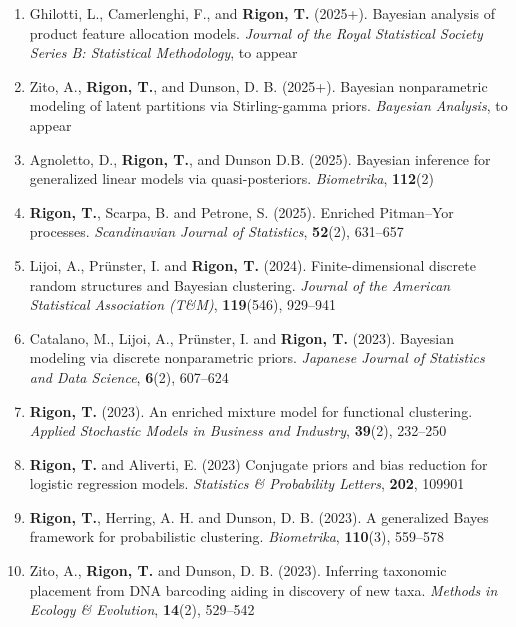 \documentclass[10pt]{article}
\begin{document}
\begin{enumerate}

\item Ghilotti, L., Camerlenghi, F., and \textbf{Rigon, T.} (2025+). Bayesian analysis of product feature allocation models. \textit{Journal of the Royal Statistical Society Series B: Statistical Methodology}, to appear


\item Zito, A., \textbf{Rigon, T.}, and Dunson, D. B. (2025+). Bayesian nonparametric modeling of latent partitions via Stirling-gamma priors. \textit{Bayesian Analysis}, to appear

\item Agnoletto, D., \textbf{Rigon, T.}, and Dunson D.B. (2025). Bayesian inference for generalized linear models via quasi-posteriors. \emph{Biometrika}, \textbf{112}(2)

\item \textbf{Rigon, T.}, Scarpa, B. and Petrone, S. (2025). Enriched Pitman--Yor processes. \textit{Scandinavian Journal of Statistics}, \textbf{52}(2), 631--657

\item Lijoi, A., Pr\"unster, I. and \textbf{Rigon, T.} (2024). Finite-dimensional discrete random structures and Bayesian clustering. \textit{Journal of the American Statistical Association (T\&M)}, \textbf{119}(546), 929--941

\item Catalano, M., Lijoi, A., Pr\"unster, I. and \textbf{Rigon, T.} (2023). Bayesian modeling via discrete nonparametric priors. \textit{Japanese Journal of Statistics and Data Science}, \textbf{6}(2), 607--624

\item \textbf{Rigon, T.} (2023). An enriched mixture model for functional clustering. \emph{Applied Stochastic Models in Business and Industry}, \textbf{39}(2), 232--250

\item \textbf{Rigon, T.} and Aliverti, E. (2023) Conjugate priors and bias reduction for logistic regression models. \textit{Statistics \& Probability Letters}, \textbf{202}, 109901

\item \textbf{Rigon, T.}, Herring, A. H. and Dunson, D. B. (2023). A generalized Bayes framework for probabilistic clustering. \textit{Biometrika}, \textbf{110}(3), 559--578

\item Zito, A., \textbf{Rigon, T.} and Dunson, D. B. (2023). Inferring taxonomic placement from DNA barcoding aiding in discovery of new taxa. \emph{Methods in Ecology \& Evolution}, \textbf{14}(2), 529--542


\end{enumerate}
\end{document}
